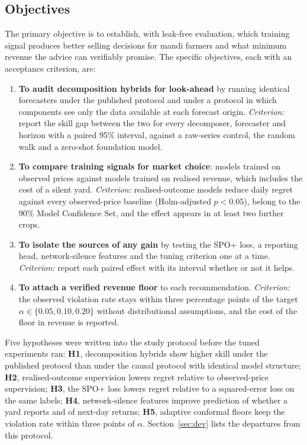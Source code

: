 \documentclass{ieeeaccess}
\begin{document}
\subsection{Objectives}
\label{sec:obj}
The primary objective is to establish, with leak-free evaluation, which training signal produces better selling decisions for mandi farmers and what minimum revenue the advice can verifiably promise. The specific objectives, each with an acceptance criterion, are:
\begin{enumerate}
\item \textbf{To audit decomposition hybrids for look-ahead} by running identical forecasters under the published protocol and under a protocol in which components see only the data available at each forecast origin. \emph{Criterion:} report the skill gap between the two for every decomposer, forecaster and horizon with a paired 95\% interval, against a raw-series control, the random walk and a zero-shot foundation model.
\item \textbf{To compare training signals for market choice}: models trained on observed prices against models trained on realised revenue, which includes the cost of a silent yard. \emph{Criterion:} realised-outcome models reduce daily regret against every observed-price baseline (Holm-adjusted $p<0.05$), belong to the 90\% Model Confidence Set, and the effect appears in at least two further crops.
\item \textbf{To isolate the sources of any gain} by testing the SPO+ loss, a reporting head, network-silence features and the tuning criterion one at a time. \emph{Criterion:} report each paired effect with its interval whether or not it helps.
\item \textbf{To attach a verified revenue floor} to each recommendation. \emph{Criterion:} the observed violation rate stays within three percentage points of the target $\alpha\in\{0.05,0.10,0.20\}$ without distributional assumptions, and the cost of the floor in revenue is reported.
\end{enumerate}
Five hypotheses were written into the study protocol before the tuned experiments ran: \textbf{H1}, decomposition hybrids show higher skill under the published protocol than under the causal protocol with identical model structure; \textbf{H2}, realised-outcome supervision lowers regret relative to observed-price supervision; \textbf{H3}, the SPO+ loss lowers regret relative to a squared-error loss on the same labels; \textbf{H4}, network-silence features improve prediction of whether a yard reports and of next-day returns; \textbf{H5}, adaptive conformal floors keep the violation rate within three points of $\alpha$. Section~\ref{sec:dev} lists the departures from this protocol.
\end{document}
